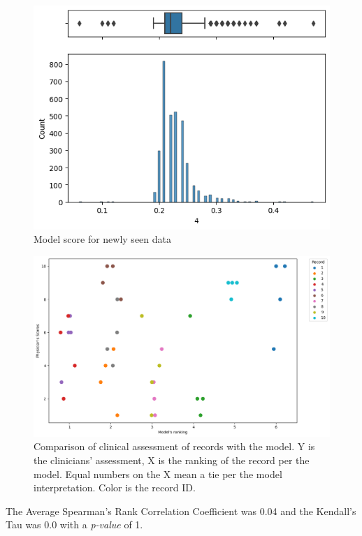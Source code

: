 \begin{figure}[htbp]
\centering
\caption{Model score for newly seen data}\label{fig:scores} 
\includegraphics[scale=0.78]{figures/Scoring.png}
\end{figure}

\begin{figure}[htbp]
\centering
\caption{Comparison of clinical assessment of records with the model. Y is the clinicians' assessment, X is the ranking of the record per the model. Equal numbers on the X mean a tie per the model interpretation. Color is the record ID.}\label{fig:clinical} 
\includegraphics[scale=0.52]{figures/clinical_assessment_dataqual_scatter.png}
\end{figure}

The Average Spearman's Rank Correlation Coefficient was 0.04 and the Kendall's Tau was 0.0 with a \textit{p-value} of 1.
